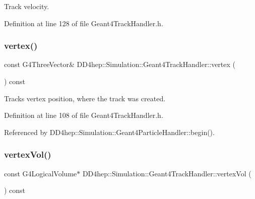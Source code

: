Track velocity. 



Definition at line 128 of file Geant4\+Track\+Handler.\+h.

\hypertarget{class_d_d4hep_1_1_simulation_1_1_geant4_track_handler_a170e1d49e624b26b540485e0aa3f5549}{}\label{class_d_d4hep_1_1_simulation_1_1_geant4_track_handler_a170e1d49e624b26b540485e0aa3f5549} 
\subsubsection{\texorpdfstring{vertex()}{vertex()}}
{\footnotesize\ttfamily const G4\+Three\+Vector\& D\+D4hep\+::\+Simulation\+::\+Geant4\+Track\+Handler\+::vertex (\begin{DoxyParamCaption}{ }\end{DoxyParamCaption}) const\hspace{0.3cm}{\ttfamily [inline]}}



Track\textquotesingle{}s vertex position, where the track was created. 



Definition at line 108 of file Geant4\+Track\+Handler.\+h.



Referenced by D\+D4hep\+::\+Simulation\+::\+Geant4\+Particle\+Handler\+::begin().

\hypertarget{class_d_d4hep_1_1_simulation_1_1_geant4_track_handler_a9a21433f606d817747006d54d3d9ef74}{}\label{class_d_d4hep_1_1_simulation_1_1_geant4_track_handler_a9a21433f606d817747006d54d3d9ef74} 
\subsubsection{\texorpdfstring{vertex\+Vol()}{vertexVol()}}
{\footnotesize\ttfamily const G4\+Logical\+Volume$\ast$ D\+D4hep\+::\+Simulation\+::\+Geant4\+Track\+Handler\+::vertex\+Vol (\begin{DoxyParamCaption}{ }\end{DoxyParamCaption}) const\hspace{0.3cm}{\ttfamily [inline]}}




